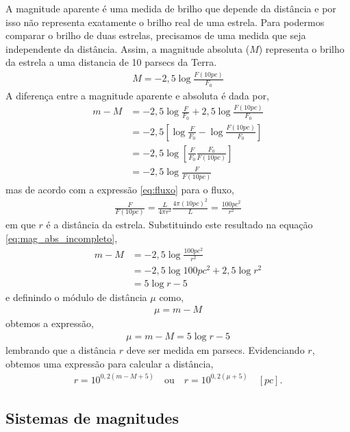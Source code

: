 A magnitude aparente é uma medida de brilho que depende da distância e por isso não representa exatamente o brilho real de uma estrela. Para podermos comparar o brilho de duas estrelas, precisamos de uma medida que seja independente da distância. Assim, a magnitude absoluta ($M$) representa o brilho da estrela a uma distancia de 10 parsecs da Terra.
\begin{align}
M = -2,5 \log \frac{F(10\si{pc})}{F_0}
\end{align}
A diferença entre a magnitude aparente e absoluta é dada por,
\begin{align}
m - M &= - 2,5 \log \frac{F}{F_0} + 2,5 \log \frac{F(10\si{pc})}{F_0} \\
&= -2,5 \left[ \log \frac{F}{F_0} - \log \frac{F(10\si{pc})}{F_0} \right] \\
&= -2,5 \log \left[ \frac{F}{F_0} \frac{F_0}{F(10\si{pc})} \right] \\
&= -2,5 \log \frac{F}{F(10\si{pc})} \label{eq:mag_abs_incompleto}
\end{align}
mas de acordo com a expressão \eqref{eq:fluxo} para o fluxo,
\begin{align}
\frac{F}{F(10\si{pc})} = \frac{L}{4\pi r^2} \frac{4\pi \left(10 \si{pc}\right)^2}{L} = \frac{100 \si{pc}^2}{r^2}
\end{align}
em que $r$ é a distância da estrela. Substituindo este resultado na equação \eqref{eq:mag_abs_incompleto},
\begin{align}
m - M &= -2,5 \log \frac{100 \si{pc}^2}{r^2} \\
&= -2,5 \log 100 \si{pc}^2 + 2,5 \log r^2 \\
&= 5 \log r - 5
\end{align}
e definindo o módulo de distância $\mu$ como,
\begin{align}
\mu = m - M
\end{align}
obtemos a expressão,
\begin{align}
\mu = m - M = 5 \log r - 5 \label{eq:modulo_distancia}
\end{align}
lembrando que a distância $r$ deve ser medida em parsecs. Evidenciando $r$, obtemos uma expressão para calcular a distância,
\begin{align}
r = 10^{0,2\left( m - M + 5 \right)} \quad \text{ou} \quad  r = 10^{0,2\left( \mu + 5 \right)} \quad \left[ \si{pc} \right].
\end{align}

\subsection{Sistemas de magnitudes}

